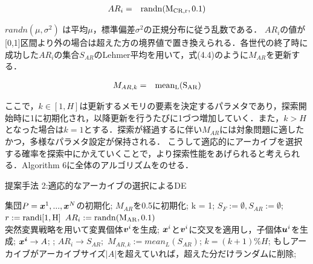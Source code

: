 \documentclass[a4paper,11pt,oneside,openany]{jsbook}
\def\vector#1{\mbox{\boldmath $#1$}}
\begin{document}
\begin{eqnarray}
  AR_i & = & \rm{randn}(M_{CR,r}, 0.1)
\end{eqnarray}

$randn(\mu,\sigma^2)$ は平均$\mu$，標準偏差$\sigma^2$の正規分布に従う乱数である．
$AR_i$の値が[0,1]区間より外の場合は超えた方の境界値で置き換えられる．各世代の終了時に成功した$AR_i$の集合$S_{AR}$のLehmer平均を用いて，式(4.4)のように$M_{AR}$を更新する．

\begin{eqnarray}
  M_{AR,k} & = & \rm{mean_L}(S_{AR})
\end{eqnarray}

ここで，$k \in [1,H]$は更新するメモリの要素を決定するパラメタであり，探索開始時に1に初期化され，以降更新を行うたびに1づつ増加していく．また，$k > H$となった場合は$k = 1$とする．探索が経過するに伴い$M_{AR}$には対象問題に適したかつ，多様なパラメタ設定が保持される．
こうして適応的にアーカイブを選択する確率を探索中にかえていくことで，より探索性能をあげられると考えられる．Algorithm 6に全体のアルゴリズムをのせる．

\newpage
\begin{algorithm}
\caption{提案手法 2:適応的なアーカイブの選択によるDE}
\label{alg:pbnf}
\begin{algorithmic}
\STATE 集団$P={\vector{x}^1,...,\vector{x}^N}$の初期化;
\STATE $M _{AR}$を0.5に初期化;
\STATE k = 1;
    \STATE $S_F := \emptyset, S_{AR} := \emptyset$;
        \STATE $r := \rm{randi}[1,H]$
        \STATE $AR_i := \rm{randn}(M_{AR}, 0.1)$ \\
        \STATE 突然変異戦略を用いて変異個体{$\vector{v}^i$}を生成;
        \STATE $\vector{x}^i$と$\vector{v}^i$に交叉を適用し，子個体$\vector{u}^i$を生成;
     \ENDFOR
        \IF {$f(\vector{u}^i) \leqq f(\vector{x}^i)$}
            \STATE $\vector{x^i} \rightarrow {A}$;
            \STATE {$\vector{x}^i := \vector{u}^i$};
            \STATE $AR_i \rightarrow S_{AR};$
        \ENDIF
    \ENDFOR
        \STATE $M_{AR,k}  :=  mean_L(S_{AR})$;
        \STATE $k = (k+1) \% H$;
    \ENDIF
    \STATE もしアーカイブがアーカイブサイズ$|A|$を超えていれば，超えた分だけランダムに削除;
\ENDWHILE
\end{algorithmic}
\end{algorithm}
\newpage
\end{document}
